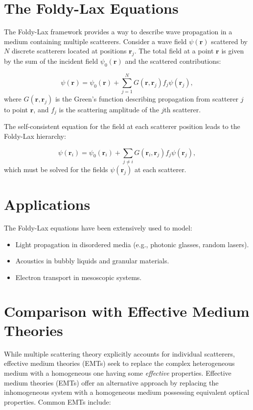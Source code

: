 \documentclass{article}
\begin{document}
\section{The Foldy-Lax Equations}
The Foldy-Lax framework provides a way to describe wave propagation in a medium containing multiple scatterers. Consider a wave field $\psi(\mathbf{r})$ scattered by $N$ discrete scatterers located at positions $\mathbf{r}_j$. The total field at a point $\mathbf{r}$ is given by the sum of the incident field $\psi_0(\mathbf{r})$ and the scattered contributions:

\begin{equation}
    \psi(\mathbf{r}) = \psi_0(\mathbf{r}) + \sum_{j=1}^{N} G(\mathbf{r}, \mathbf{r}_j) f_j \psi(\mathbf{r}_j),
\end{equation}
where $G(\mathbf{r}, \mathbf{r}_j)$ is the Green's function describing propagation from scatterer $j$ to point $\mathbf{r}$, and $f_j$ is the scattering amplitude of the $j$th scatterer.

The self-consistent equation for the field at each scatterer position leads to the Foldy-Lax hierarchy:

\begin{equation}
    \psi(\mathbf{r}_i) = \psi_0(\mathbf{r}_i) + \sum_{j\neq i} G(\mathbf{r}_i, \mathbf{r}_j) f_j \psi(\mathbf{r}_j),
\end{equation}
which must be solved for the fields $\psi(\mathbf{r}_j)$ at each scatterer.

\section{Applications}
The Foldy-Lax equations have been extensively used to model:
\begin{itemize}
    \item Light propagation in disordered media (e.g., photonic glasses, random lasers).
    \item Acoustics in bubbly liquids and granular materials.
    \item Electron transport in mesoscopic systems.
\end{itemize}

\section{Comparison with Effective Medium Theories}
While multiple scattering theory explicitly accounts for individual scatterers, effective medium theories (EMTs) seek to replace the complex heterogeneous medium with a homogeneous one having some \textit{effective} properties. Effective medium theories (EMTs) offer an alternative approach by replacing the inhomogeneous system with a homogeneous medium possessing equivalent optical properties. Common EMTs include:
\end{document}
